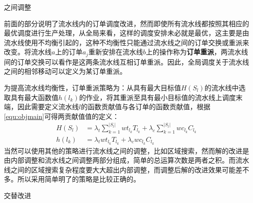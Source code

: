 \begin{asparaenum}
\item 之间调整

前面的部分说明了流水线内的订单调度改进，然而即使所有流水线都按照其相应的最优调度进行生产处理，从全局来看，这样的调度安排未必就是最优，这主要是由流水线使用不均衡引起的，这种不均衡性只能通过流水线之间的订单交换或重派来改变。将流水线$a$上的订单$a_j$重新安排在流水线$b$上的操作称为\textbf{订单重派}，两流水线间的订单交换可以看作是这两条流水线互相订单重派。因此，全局调度关于流水线之间的相邻移动可以定义为某订单重派。

为提高流水线均衡性，订单重派策略为：从具有最大目标值$H(S_l)$的流水线中选取具有最大函数值$h(l_k)$的作业，将其重派至具有最小目标值的流水线上调度末端，因此需要定义流水线$l$的函数贡献值与各订单的函数贡献值，根据\eqref{equ:objmain}可得两贡献值值的定义：
\begin{align}
H(S_l) &= \lambda_t\sum_{k=1}^{|S_l|} wt_{l_k}T_{l_k} + \lambda_c\sum_{k=1}^{|S_l|}wc_{l_k}C_{l_k}\label{equ:linefunct}\\
h(l_k) &= \lambda_t wt_{l_k}T_{l_k} + \lambda_c wc_{l_k}C_{l_k}
\label{equ:itemfunct}
\end{align}
当然可以使用其他的策略进行流水线之间的调整，比如区域搜索，然而解的改进是由内部调整和流水线之间调整两部分组成，简单的总运算次数是两者之积。而流水线之间的区域搜索复杂程度要大大超出内部调整，而调整后解的改进效果可能差不多。所以采用简单明了的策略是比较正确的。

\item 交替改进
\end{asparaenum} 

